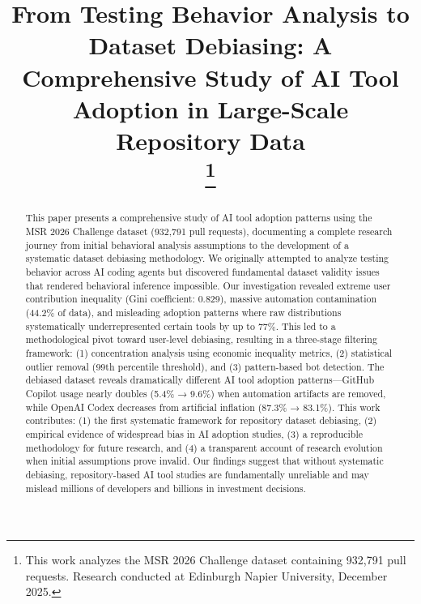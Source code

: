 \documentclass[conference]{IEEEtran}
\begin{document}
\title{From Testing Behavior Analysis to Dataset Debiasing: A Comprehensive Study of AI Tool Adoption in Large-Scale Repository Data\\
\thanks{This work analyzes the MSR 2026 Challenge dataset containing 932,791 pull requests. Research conducted at Edinburgh Napier University, December 2025.}
}

\author{
}

\maketitle

\begin{abstract}
This paper presents a comprehensive study of AI tool adoption patterns using the MSR 2026 Challenge dataset (932,791 pull requests), documenting a complete research journey from initial behavioral analysis assumptions to the development of a systematic dataset debiasing methodology. We originally attempted to analyze testing behavior across AI coding agents but discovered fundamental dataset validity issues that rendered behavioral inference impossible. Our investigation revealed extreme user contribution inequality (Gini coefficient: 0.829), massive automation contamination (44.2\% of data), and misleading adoption patterns where raw distributions systematically underrepresented certain tools by up to 77\%. This led to a methodological pivot toward user-level debiasing, resulting in a three-stage filtering framework: (1) concentration analysis using economic inequality metrics, (2) statistical outlier removal (99th percentile threshold), and (3) pattern-based bot detection. The debiased dataset reveals dramatically different AI tool adoption patterns—GitHub Copilot usage nearly doubles (5.4\% → 9.6\%) when automation artifacts are removed, while OpenAI Codex decreases from artificial inflation (87.3\% → 83.1\%). This work contributes: (1) the first systematic framework for repository dataset debiasing, (2) empirical evidence of widespread bias in AI adoption studies, (3) a reproducible methodology for future research, and (4) a transparent account of research evolution when initial assumptions prove invalid. Our findings suggest that without systematic debiasing, repository-based AI tool studies are fundamentally unreliable and may mislead millions of developers and billions in investment decisions.
\end{abstract}
\end{document}
